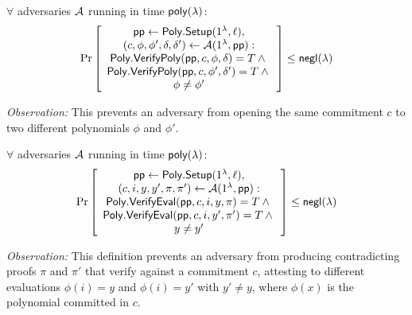 \begin{definition}
\label{def:polycommit:poly-binding}
$\forall$ adversaries ${\mathcal{A}}$ running in time $\mathsf{poly}(\lambda)$:
\begin{align*}
\Pr \left[ \begin{array}{c}
    \mathsf{pp} \leftarrow \mathsf{Poly.Setup}(1^\lambda, \ell),\\
    (c,\phi,\phi',\delta,\delta') \leftarrow \mathcal{A}(1^\lambda, \mathsf{pp}):\\
    {\mathsf{Poly.VerifyPoly}(\mathsf{pp}, c, \phi, \delta) = T } \wedge {}\\
    {\mathsf{Poly.VerifyPoly}(\mathsf{pp}, c, \phi', \delta') = T } \wedge {}\\
    {\phi \ne \phi'}
\end{array} \right] \le \mathsf{negl}(\lambda)
\end{align*}
\end{definition}

\noindent \textit{Observation:}
This prevents an adversary from opening the same commitment $c$ to two different polynomials $\phi$ and $\phi'$.

\begin{definition}
\label{def:polycommit:eval-binding}
$\forall$ adversaries ${\mathcal{A}}$ running in time $\mathsf{poly}(\lambda)$:
\begin{align*}
\Pr \left[ \begin{array}{c}
    \mathsf{pp} \leftarrow \mathsf{Poly.Setup}(1^\lambda, \ell),\\
    (c, i, y, y', \pi, \pi') \leftarrow {\ensuremath{\mathcal{A}}}(1^\lambda, \mathsf{pp}):\\
    \mathsf{Poly.VerifyEval{}}(\mathsf{pp},c,i,y, \pi) = T \wedge {}\\
    \mathsf{Poly.VerifyEval{}}(\mathsf{pp},c,i,y', \pi') = T \wedge {}\\
    y \ne y'
\end{array} \right] \le \mathsf{negl}(\lambda)
\end{align*}
\end{definition}

\noindent \textit{Observation:}
This definition prevents an adversary from producing contradicting proofs $\pi$ and $\pi'$ that verify against a commitment $c$, attesting to different evaluations $\phi(i)=y$ and $\phi(i)=y'$ with $y'\ne y$, where $\phi(x)$ is the polynomial committed in $c$.

